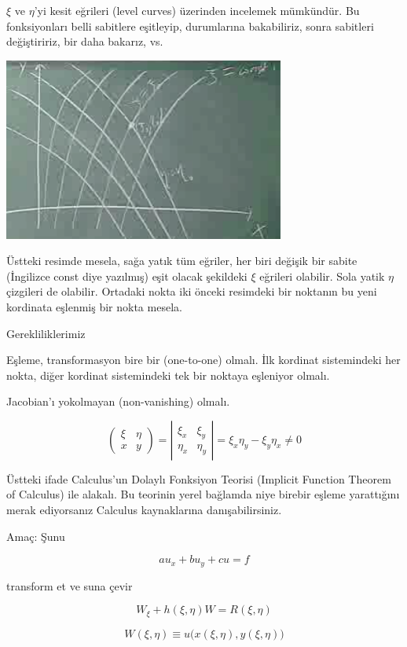 \documentclass[12pt,fleqn]{article}\usepackage{../../common}
\begin{document}
$\xi$ ve $\eta$'yi kesit eğrileri (level curves) üzerinden incelemek
mümkündür. Bu fonksiyonları belli sabitlere eşitleyip, durumlarına
bakabiliriz, sonra sabitleri değiştiririz, bir daha bakarız, vs. 

\includegraphics[height=6cm]{1_14.png}

Üstteki resimde mesela, sağa yatık tüm eğriler, her biri değişik bir sabite
(İngilizce const diye yazılmış) eşit olacak şekildeki $\xi$ eğrileri
olabilir. Sola yatik $\eta$ çizgileri de olabilir. Ortadaki nokta iki
önceki resimdeki bir noktanın bu yeni kordinata eşlenmiş bir nokta mesela.

Gerekliliklerimiz

Eşleme, transformasyon bire bir (one-to-one) olmalı. İlk kordinat
sistemindeki her nokta, diğer kordinat sistemindeki tek bir noktaya
eşleniyor olmalı. 

Jacobian'ı yokolmayan (non-vanishing) olmalı. 

$$ 
\left(\begin{array}{rr}
\xi & \eta \\
x & y
\end{array}\right) = 
\left|\begin{array}{rr}
\xi_x & \xi_y \\
\eta_x & \eta_y
\end{array}\right| =
\xi_x \eta_y - \xi_y \eta_x \ne 0
 $$

Üstteki ifade Calculus'un Dolaylı Fonksiyon Teorisi (Implicit Function
Theorem of Calculus) ile alakalı. Bu teorinin yerel bağlamda niye birebir
eşleme yarattığını merak ediyorsanız Calculus kaynaklarına
danışabilirsiniz. 

Amaç: Şunu 

$$ au_x + bu_y + cu = f $$

transform et ve suna çevir

$$ W_\xi + h(\xi, \eta)W = R(\xi,\eta)$$


$$ W(\xi,\eta) \equiv u \bigg( x(\xi,\eta),y(\xi,\eta) \bigg) $$
\end{document}
